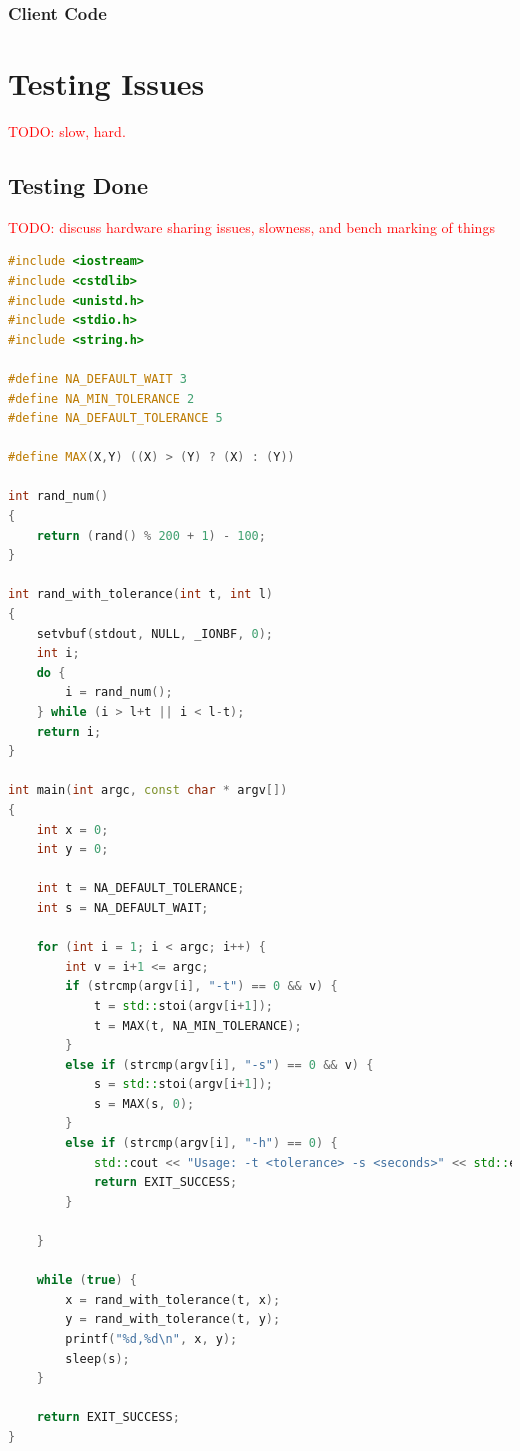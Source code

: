 \documentclass[11pt,a4paper,titlepage]{report}
\begin{document}


\subsubsection{Client Code}




\section{Testing Issues}

\textcolor{red}{TODO: slow, hard.}


\subsection{Testing Done}

\textcolor{red}{TODO: discuss hardware sharing issues, slowness, and bench marking of things}

\begin{lstlisting}[caption=rand-face-detect.cpp,language=C++]
#include <iostream>
#include <cstdlib>
#include <unistd.h>
#include <stdio.h>
#include <string.h>

#define NA_DEFAULT_WAIT 3
#define NA_MIN_TOLERANCE 2
#define NA_DEFAULT_TOLERANCE 5

#define MAX(X,Y) ((X) > (Y) ? (X) : (Y))

int rand_num()
{
    return (rand() % 200 + 1) - 100;
}

int rand_with_tolerance(int t, int l)
{
    setvbuf(stdout, NULL, _IONBF, 0);
    int i;
    do {
        i = rand_num();
    } while (i > l+t || i < l-t);
    return i;
}

int main(int argc, const char * argv[])
{
    int x = 0;
    int y = 0;

    int t = NA_DEFAULT_TOLERANCE;
    int s = NA_DEFAULT_WAIT;

    for (int i = 1; i < argc; i++) {
        int v = i+1 <= argc;
        if (strcmp(argv[i], "-t") == 0 && v) {
            t = std::stoi(argv[i+1]);
            t = MAX(t, NA_MIN_TOLERANCE);
        }
        else if (strcmp(argv[i], "-s") == 0 && v) {
            s = std::stoi(argv[i+1]);
            s = MAX(s, 0);
        }
        else if (strcmp(argv[i], "-h") == 0) {
            std::cout << "Usage: -t <tolerance> -s <seconds>" << std::endl;
            return EXIT_SUCCESS;
        }

    }

    while (true) {
        x = rand_with_tolerance(t, x);
        y = rand_with_tolerance(t, y);
        printf("%d,%d\n", x, y);
        sleep(s);
    }

    return EXIT_SUCCESS;
}
\end{lstlisting}
\end{document}
